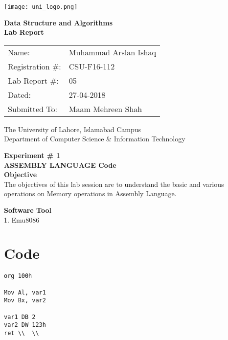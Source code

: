 \documentclass[11pt]{article}            %
\begin{document}
\begin{titlepage}
    \centering
  \vfill
    \texttt{[image: uni\_logo.png]} \\ 
	\vskip2cm
    {\bfseries\Large
	Data Structure and Algorithms \\ 
	
	\vskip2cm
	Lab Report 
	 
	\vskip2cm
	}    

\begin{center}
\begin{tabular}{ l l  } 

Name: & Muhammad Arslan Ishaq \\ 
Registration \#: & CSU-F16-112 \\ 
Lab Report \#: & 05 \\ 
 Dated:& 27-04-2018\\ 
Submitted To:& Maam Mehreen Shah\\ 

\end{tabular}
\end{center}
    \vfill
    The University of Lahore, Islamabad Campus\\
Department of Computer Science \& Information Technology
\end{titlepage}


    
    {\bfseries\Large
\centering
	Experiment \# 1 \\

ASSEMBLY LANGUAGE Code  \\
	
	}    
 \vskip1cm
 \textbf {Objective}\\  The objectives of this lab session are to understand the basic and various operations on Memory operations in Assembly Language. 
 
 \textbf {Software Tool} \\
1.   Emu8086\ 


\section{Code }              
\begin{lstlisting}
org 100h

Mov Al, var1
Mov Bx, var2

var1 DB 2
var2 DW 123h
ret \\  \\
\end{lstlisting}
\end{document}
